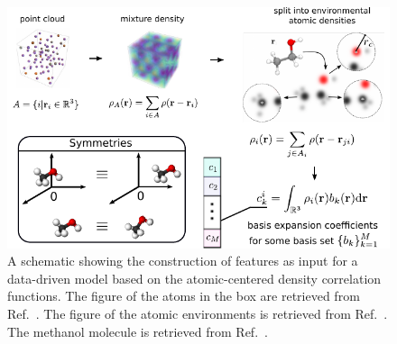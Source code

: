 \begin{figure}
  \centering
  \includegraphics[width=\textwidth]{fig/atomistic_repr_schematic.pdf}
  \caption{A schematic showing the construction of features as input for a data-driven model based on the atomic-centered density correlation functions. The figure of the atoms in the box are retrieved from Ref.~\cite{noh2019inverse}. The figure of the atomic environments is retrieved from Ref.~\cite{will+19jcp}. The methanol molecule is retrieved from Ref.~\cite{wiki:Alcohol_(chemistry)}.}
  \label{fig:acdc-scheme}
\end{figure}



